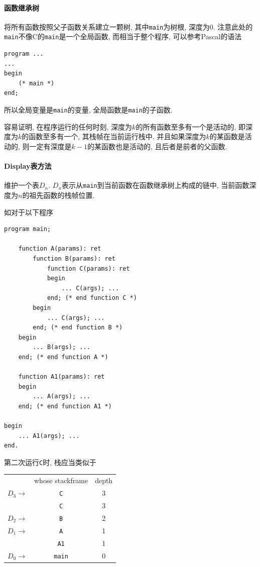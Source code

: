 \documentclass{ctexart}
\begin{document}
\paragraph{函数继承树}
    将所有函数按照父子函数关系建立一颗树,
    其中\verb/main/为树根, 深度为$0$.
    注意此处的\verb/main/不像C的\verb/main/是一个全局函数,
    而相当于整个程序, 可以参考Pascal的语法\begin{verbatim}program ...
... 
begin 
    (* main *) 
end;\end{verbatim} 所以全局变量是\verb/main/的变量, 全局函数是\verb/main/的子函数.\par
    容易证明, 在程序运行的任何时刻, 深度为$k$的所有函数至多有一个是活动的,
    即深度为$k$的函数至多有一个, 其栈帧在当前运行栈中.
    并且如果深度为$k$的某函数是活动的, 则一定有深度是$k-1$的某函数也是活动的, 且后者是前者的父函数.
\paragraph{Display表方法}
    维护一个表$D_n$.
    $D_n$表示从\verb/main/到当前函数在函数继承树上构成的链中,
    当前函数深度为$n$的祖先函数的栈帧位置.\par
    如对于以下程序 \begin{verbatim}
program main;

    function A(params): ret
        function B(params): ret
            function C(params): ret
            begin
                ... C(args); ...
            end; (* end function C *)
        begin
            ... C(args); ...
        end; (* end function B *)
    begin
        ... B(args); ...
    end; (* end function A *)

    function A1(params): ret
    begin
        ... A(args); ...
    end; (* end function A1 *)

begin
    ... A1(args); ...
end.
\end{verbatim}
第二次运行\verb/C/时, 栈应当类似于\\
    \begin{center}\begin{tabularx}{0.6\textwidth}{r|C|c|}
        & whose stackframe & depth\\
        $D_3 \to$ & \verb/C/ & 3
        \\
        & \verb/C/ & 3
        \\
        $D_2 \to$ & \verb/B/ & 2
        \\
        $D_1 \to$ & \verb/A/ & 1
        \\
        & \verb/A1/ & 1
        \\
        $D_0 \to$ & \verb/main/ & 0
        \\
    \end{tabularx}
    \end{center}
\end{document}
